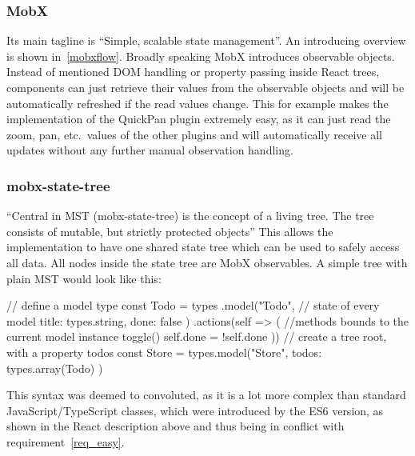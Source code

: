 \subsubsection*{MobX}
Its main tagline is ``Simple, scalable state
  management''\cite*{noauthor_mobx:_2018}. An introducing overview is shown
  in~\autoref{mobxflow}. Broadly speaking MobX introduces observable objects.
  Instead of mentioned DOM handling or property passing inside React trees,
  components can just retrieve their values from the observable objects and will
  be automatically refreshed if the read values change. This for example makes
  the implementation of the QuickPan plugin extremely easy, as it can just read
  the zoom, pan, etc.\ values of the other plugins and will automatically receive
  all updates without any further manual observation handling.
\subsubsection*{mobx-state-tree}
``Central in MST (mobx-state-tree) is the concept of a
  living tree. The tree consists of mutable, but strictly protected
  objects''\cite*{noauthor_mobx-state-tree:_2018} This allows the implementation
  to have one shared state tree which can be used to safely access all data. All
  nodes inside the state tree are MobX observables. A simple tree with plain MST
  would look like this:
\begin{typescript}
// define a model type
const Todo = types
 .model("Todo", {
  // state of every model
  title: types.string,
  done: false
 })
 .actions(self => ({
  //methods bounds to the current model instance
  toggle() {
   self.done = !self.done
  }
 }))
// create a tree root, with a property todos
const Store = types.model("Store", {
    todos: types.array(Todo)
})
\end{typescript}
This syntax was deemed to convoluted, as it is a lot more complex than standard
JavaScript/TypeScript classes, which were introduced by the ES6 version, as shown in the React description above and
thus being in conflict with requirement~\ref{req_easy}.

